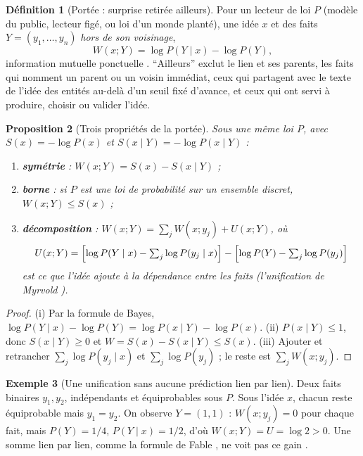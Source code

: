 \documentclass[11pt,a4paper]{article}
\theoremstyle{definition}
\newtheorem{definition}{Définition}[section]
\newtheorem{exemple}[definition]{Exemple}
\theoremstyle{plain}
\newtheorem{proposition}[definition]{Proposition}
\begin{document}
\begin{definition}[Portée : surprise retirée ailleurs]
\label{def:portee}
Pour un lecteur de loi $P$ (modèle du public, lecteur figé, ou loi d'un monde planté), une idée $x$
et des faits $Y=(y_1,\dots,y_n)$ \emph{hors de son voisinage},
\[ W(x;Y)=\log P(Y\mid x)-\log P(Y), \]
information mutuelle ponctuelle \cite[section~2]{q2}. \enquote{Ailleurs} exclut le lien et ses
parents, les faits qui nomment un parent ou un voisin immédiat, ceux qui partagent avec le texte de
l'idée des entités au-delà d'un seuil fixé d'avance, et ceux qui ont servi à produire, choisir ou
valider l'idée.
\end{definition}

\begin{proposition}[Trois propriétés de la portée]
\label{prop:portee}
Sous une même loi $P$, avec $S(x)=-\log P(x)$ et $S(x\mid Y)=-\log P(x\mid Y)$ :
\begin{enumerate}[label=(\roman*)]
\item \textbf{symétrie} : $W(x;Y)=S(x)-S(x\mid Y)$ ;
\item \textbf{borne} : si $P$ est une loi de probabilité sur un ensemble discret, $W(x;Y)\le S(x)$ ;
\item \textbf{décomposition} : $W(x;Y)=\sum_jW(x;y_j)+U(x;Y)$, où
\[ U(x;Y)=\Bigl[\log P(Y\mid x)-\textstyle\sum_j\log P(y_j\mid x)\Bigr]-\Bigl[\log P(Y)-\textstyle\sum_j\log P(y_j)\Bigr] \]
est ce que l'idée ajoute à la dépendance entre les faits (l'unification de Myrvold \cite{myrvold2003}).
\end{enumerate}
\end{proposition}
\begin{proof}
(i) Par la formule de Bayes, $\log P(Y\mid x)-\log P(Y)=\log P(x\mid Y)-\log P(x)$.
(ii) $P(x\mid Y)\le1$, donc $S(x\mid Y)\ge0$ et $W=S(x)-S(x\mid Y)\le S(x)$.
(iii) Ajouter et retrancher $\sum_j\log P(y_j\mid x)$ et $\sum_j\log P(y_j)$ ; le reste est
$\sum_jW(x;y_j)$.
\end{proof}

\begin{exemple}[Une unification sans aucune prédiction lien par lien]
\label{ex:unification}
Deux faits binaires $y_1,y_2$, indépendants et équiprobables sous $P$. Sous l'idée $x$, chacun reste
équiprobable mais $y_1=y_2$. On observe $Y=(1,1)$ : $W(x;y_j)=0$ pour chaque fait, mais
$P(Y)=1/4$, $P(Y\mid x)=1/2$, d'où $W(x;Y)=U=\log2>0$. Une somme lien par lien, comme la formule de
Fable \cite[partie~2]{fable}, ne voit pas ce gain \cite[section~2]{q2}.
\end{exemple}
\end{document}
